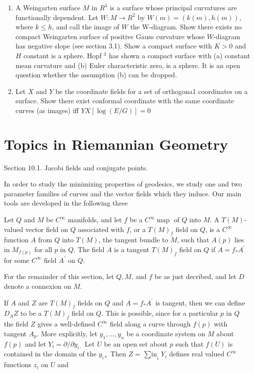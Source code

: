 \documentclass[10pt]{article}
\begin{document}
\begin{enumerate}
  \item A Weingarten surface $M$ in $R^{3}$ is a surface whose principal curvatures are functionally dependent. Let $W: M \rightarrow R^{2}$ by $W(m)=(k(m), h(m))$, where $k \leq h$, and call the image of $W$ the W-diagram. Show there exists no compact Weingarten surface of positive Gauss curvature whose $W$-diagram has negative slope (see section 3.1). Show a compact surface with $K>0$ and $H$ constant is a sphere. Hopf ${ }^{3}$ has shown a compact surface with (a) constant mean curvature and (b) Euler characteristic zero, is a sphere. It is an open question whether the assumption (b) can be dropped.

  \item Let $X$ and $Y$ be the coordinate fields for a set of orthogona1 coordinates on a surface. Show there exist conformal coordinate with the same coordinate curves (as images) iff $Y X[\log (E / G)]=0$

\end{enumerate}
\section{Topics in Riemannian Geometry}
Section 10.1. Jacobi fields and conjugate points.

In order to study the minimizing properties of geodesics, we study one and two parameter families of curves and the vector fields which they induce. Our main tools are developed in the following three

Let $Q$ and $M$ be $C^{\infty}$ manifolds, and let $f$ be a $C^{\infty} \operatorname{map}$ of $Q$ into $M$. A $T(M)$-valued vector field on $Q$ associated with $f$, or a $T(M)_{f}$ field on $Q$, is a $C^{\infty}$ function $A$ from $Q$ into $T(M)$, the tangent bundle to $M$, such that $A(p)$ lies in $M_{f(p)}$ for all $p$ in $Q$. The field $A$ is a tangent $T(M)_{f}$ field on $Q$ if $A=f_{*} A^{\prime}$ for some $C^{\infty}$ field $A^{\prime}$ on $Q$.

For the remainder of this section, let $Q, M$, and $f$ be as just decribed, and let $D$ denote a connexion on $M$.

If $A$ and $Z$ are $T(M)_{f}$ fields on $Q$ and $A=f_{*} A^{\prime}$ is tangent, then we can define $D_{A} Z$ to be a $T(M)_{f}$ field on $Q$. This is possible, since for a particular $p$ in $Q$ the field $Z$ gives a well-defined $C^{\infty}$ field along a curve through $f(p)$ with tangent $A_{p}$. More explicitly, let $y_{1}, \ldots, y_{n}$ be a coordinate system on $M$ about $f(p)$ and let $Y_{i}=\partial / \partial y_{i \cdot}$ Let $U$ be an open set about $p$ such that $f(U)$ is contained in the domain of the $y_{i *}$ Then $Z=\operatorname{\sum in}_{i} Y_{i}$ defines real valued $C^{\infty}$ functions $z_{i}$ on $U$ and
\end{document}
